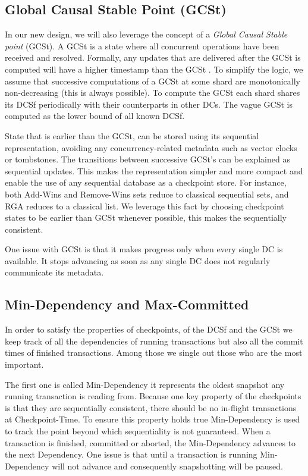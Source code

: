 \documentclass[twoside]{article}
\begin{document}
\subsection{Global Causal Stable Point (GCSt)}
\label{sec:causal-stable-snapshot}

In our new design, we will also leverage the concept of a
\emph{Global Causal Stable point} (GCSt).
A GCSt is a state where all concurrent operations have been received and
resolved.
Formally, any updates that are delivered after the GCSt is computed will
have a higher timestamp than the GCSt
\cite[Definition~5.1]{app:rep:1800}.
To simplify the logic, we assume that successive computations of a GCSt
at some shard are monotonically non-decreasing (this is always
possible).
To compute the GCSt each shard shares its DCSf periodically with their
counterparts in other DCs. 
The vague GCSt is computed as the lower bound of all known DCSf.

State that is earlier than the GCSt, can be stored using its 
sequential representation, avoiding any concurrency-related metadata such as
vector clocks or tombstones.
The transitions between successive GCSt's can be explained as sequential
updates.
This makes the representation simpler and more compact and enable the 
use of any sequential database as a checkpoint store.
For instance, both Add-Wins and Remove-Wins sets reduce to classical
sequential sets, and RGA reduces to a classical list.
We leverage this fact by choosing checkpoint states to be earlier than 
GCSt whenever possible, this makes the sequentially consistent.

One issue with GCSt is that it makes progress only when every single DC
is available.
It stops advancing as soon as any single DC does not regularly communicate its
metadata.

\subsection{Min-Dependency and Max-Committed}
\label{sec:dep-commit}
In order to satisfy the properties of checkpoints, of the DCSf and the GCSt we keep
track of all the dependencies of running transactions but also all the commit
times of finished transactions. 
Among those we single out those who are the most important.

The first one is called Min-Dependency it represents the oldest snapshot any
running transaction is reading from. 
Because one key property of the checkpoints is that they are sequentially
consistent, there should be no in-flight transactions at Checkpoint-Time.
To ensure this property holds true Min-Dependency is used to track the point
beyond which sequentiality is not guaranteed.
When a transaction is finished, committed or aborted, the Min-Dependency
advances to the next Dependency. 
One issue is that until a transaction is running Min-Dependency
will not advance and consequently snapshotting will be paused.
\end{document}
